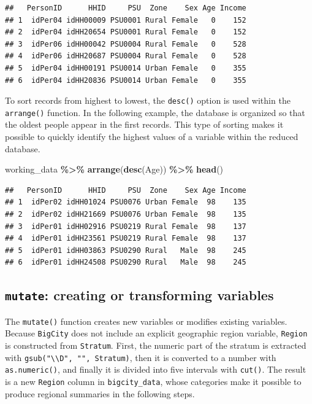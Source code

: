 \documentclass[
  english,
  12pt,
]{book}
\newenvironment{Shaded}{\begin{snugshade}}{\end{snugshade}}
\newcommand{\FunctionTok}[1]{\textcolor[rgb]{0.13,0.29,0.53}{\textbf{#1}}}
\newcommand{\NormalTok}[1]{#1}
\newcommand{\SpecialCharTok}[1]{\textcolor[rgb]{0.81,0.36,0.00}{\textbf{#1}}}
\begin{document}
\begin{verbatim}
##   PersonID      HHID     PSU  Zone    Sex Age Income
## 1  idPer04 idHH00009 PSU0001 Rural Female   0    152
## 2  idPer04 idHH20654 PSU0001 Rural Female   0    152
## 3  idPer06 idHH00042 PSU0004 Rural Female   0    528
## 4  idPer06 idHH20687 PSU0004 Rural Female   0    528
## 5  idPer04 idHH00191 PSU0014 Urban Female   0    355
## 6  idPer04 idHH20836 PSU0014 Urban Female   0    355
\end{verbatim}

To sort records from highest to lowest, the \texttt{desc()} option is used within the \texttt{arrange()} function. In the following example, the database is organized so that the oldest people appear in the first records. This type of sorting makes it possible to quickly identify the highest values of a variable within the reduced database.

\begin{Shaded}
\begin{Highlighting}[]
\NormalTok{working\_data }\SpecialCharTok{\%\textgreater{}\%}
  \FunctionTok{arrange}\NormalTok{(}\FunctionTok{desc}\NormalTok{(Age)) }\SpecialCharTok{\%\textgreater{}\%}
  \FunctionTok{head}\NormalTok{()}
\end{Highlighting}
\end{Shaded}

\begin{verbatim}
##   PersonID      HHID     PSU  Zone    Sex Age Income
## 1  idPer02 idHH01024 PSU0076 Urban Female  98    135
## 2  idPer02 idHH21669 PSU0076 Urban Female  98    135
## 3  idPer01 idHH02916 PSU0219 Rural Female  98    137
## 4  idPer01 idHH23561 PSU0219 Rural Female  98    137
## 5  idPer01 idHH03863 PSU0290 Rural   Male  98    245
## 6  idPer01 idHH24508 PSU0290 Rural   Male  98    245
\end{verbatim}

\subsection{\texorpdfstring{\texttt{mutate}: creating or transforming variables}{mutate: creating or transforming variables}}\label{mutate-creacion-o-transformacion-de-variables}

The \texttt{mutate()} function creates new variables or modifies existing variables. Because \texttt{BigCity} does not include an explicit geographic region variable, \texttt{Region} is constructed from \texttt{Stratum}. First, the numeric part of the stratum is extracted with \texttt{gsub("\textbackslash{}\textbackslash{}D",\ "",\ Stratum)}, then it is converted to a number with \texttt{as.numeric()}, and finally it is divided into five intervals with \texttt{cut()}. The result is a new \texttt{Region} column in \texttt{bigcity\_data}, whose categories make it possible to produce regional summaries in the following steps.
\end{document}
